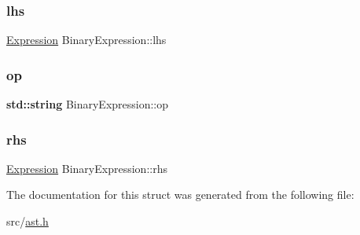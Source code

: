 \subsubsection{\texorpdfstring{lhs}{lhs}}
{\footnotesize\ttfamily \hyperlink{ast_8h_a4cb273a4d960cd13ea17d08f254493e8}{Expression} Binary\+Expression\+::lhs}

\mbox{\label{struct_binary_expression_a4c33b66e2ffc0a5ede2cdd190bf4bd75}} 
\subsubsection{\texorpdfstring{op}{op}}
{\footnotesize\ttfamily \textbf{ std\+::string} Binary\+Expression\+::op}

\mbox{\label{struct_binary_expression_aa25a00083ca8f135c0ffa46c527086a7}} 
\subsubsection{\texorpdfstring{rhs}{rhs}}
{\footnotesize\ttfamily \hyperlink{ast_8h_a4cb273a4d960cd13ea17d08f254493e8}{Expression} Binary\+Expression\+::rhs}



The documentation for this struct was generated from the following file\+:\begin{DoxyCompactItemize}
\item 
src/\hyperlink{ast_8h}{ast.\+h}\end{DoxyCompactItemize}
